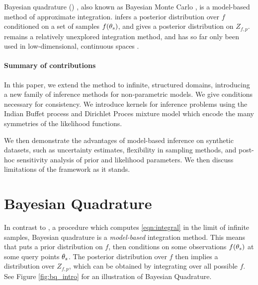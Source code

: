 %


Bayesian quadrature (\bq{}) \cite{BZHermiteQuadrature}, also known as Bayesian Monte Carlo \cite{BZMonteCarlo}, is a model-based method of approximate integration.  \bq{} infers a posterior distribution over $f$ conditioned on a set of samples $f({\bf{\theta}}_s)$, and gives a posterior distribution on $Z_{f,p}$.  \bq{} remains a relatively unexplored integration method, and has so far only been used in low-dimensional, continuous spaces \cite{BZMonteCarlo}.

\paragraph{Summary of contributions} In this paper, we extend the \bq{} method to infinite, structured domains, introducing a new family of inference methods for non-parametric models.  We give conditions necessary for consistency.  We introduce kernels for inference problems using the Indian Buffet process and Dirichlet Proces mixture model which encode the many symmetries of the likelihood functions.

We then demonstrate the advantages of model-based inference on synthetic datasets, such as uncertainty estimates, flexibility in sampling methods, and post-hoc sensitivity analysis of prior and likelihood parameters.  We then discuss limitations of the framework as it stands.

\section{Bayesian Quadrature}

In contrast to \mcmc{}, a procedure which computes \eqref{eqn:integral} in the limit of infinite samples, Bayesian quadrature is a \emph{model-based} integration method.  This means that \bq{} puts a prior distribution on $f$, then conditions on some observations $f({\bf{\theta}}_s)$ at some query points ${\bf{\theta}}_s$.  The posterior distribution over $f$ then implies a distribution over $Z_{f,p}$, which can be obtained by integrating over all possible $f$.  See Figure \ref{fig:bq_intro} for an illustration of Bayesian Quadrature.

